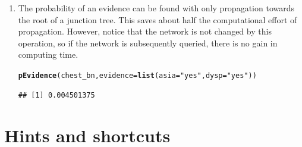 \documentclass[10pt]{article}\usepackage[]{graphicx}\usepackage[]{xcolor}
\makeatletter
\newcommand{\hlstr}[1]{\textcolor[rgb]{0.192,0.494,0.8}{#1}}%
\newcommand{\hlstd}[1]{\textcolor[rgb]{0.345,0.345,0.345}{#1}}%
\newcommand{\hlkwc}[1]{\textcolor[rgb]{0.333,0.667,0.333}{#1}}%
\newcommand{\hlkwd}[1]{\textcolor[rgb]{0.737,0.353,0.396}{\textbf{#1}}}%
\newenvironment{kframe}{%
 \def\at@end@of@kframe{}%
 \ifinner\ifhmode%
  \def\at@end@of@kframe{\end{minipage}}%
  \begin{minipage}{\columnwidth}%
 \fi\fi%
 \def\FrameCommand##1{\hskip\@totalleftmargin \hskip-\fboxsep
 \colorbox{shadecolor}{##1}\hskip-\fboxsep
     \hskip-\linewidth \hskip-\@totalleftmargin \hskip\columnwidth}%
 \MakeFramed {\advance\hsize-\width
   \@totalleftmargin\z@ \linewidth\hsize
   \@setminipage}}%
 {\par\unskip\endMakeFramed%
 \at@end@of@kframe}
\newenvironment{knitrout}{}{} %
\makeatother
\begin{document}
\begin{enumerate}
\item The probability of an evidence can be found with only
  propagation towards the root of a junction tree. This saves about
  half the computational effort of propagation. However, notice that the
  network is not changed by this operation, so if the network is
  subsequently queried, there is no gain in computing time.

\begin{knitrout}
\color{fgcolor}\begin{kframe}
\begin{alltt}
\hlkwd{pEvidence}\hlstd{(chest_bn,} \hlkwc{evidence}\hlstd{=}\hlkwd{list}\hlstd{(}\hlkwc{asia}\hlstd{=}\hlstr{"yes"}\hlstd{,} \hlkwc{dysp}\hlstd{=}\hlstr{"yes"}\hlstd{))}
\end{alltt}
\begin{verbatim}
## [1] 0.004501375
\end{verbatim}
\end{kframe}
\end{knitrout}


\end{enumerate}


\section{Hints and shortcuts}
\label{sec:small-shortcuts}
\end{document}
